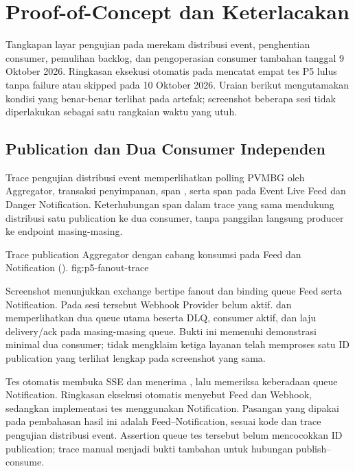 \section{Proof-of-Concept dan Keterlacakan}

Tangkapan layar pengujian pada  merekam distribusi event,
penghentian consumer, pemulihan backlog, dan pengoperasian consumer
tambahan tanggal 9 Oktober 2026. Ringkasan eksekusi otomatis pada
 mencatat empat tes
P5 lulus tanpa failure atau skipped pada 10 Oktober 2026. Uraian berikut
mengutamakan kondisi yang benar-benar terlihat pada artefak; screenshot
beberapa sesi tidak diperlakukan sebagai satu rangkaian waktu yang utuh.

\subsection{Publication dan Dua Consumer Independen}

Trace pengujian distribusi event memperlihatkan polling PVMBG oleh Aggregator, transaksi
penyimpanan, span , serta span
 pada Event Live Feed dan Danger Notification.
Keterhubungan span dalam trace yang sama mendukung distribusi satu
publication ke dua consumer, tanpa panggilan langsung producer ke
endpoint masing-masing.

{Trace publication Aggregator dengan cabang konsumsi pada Feed dan Notification ().}
{fig:p5-fanout-trace}

Screenshot  menunjukkan exchange
 bertipe fanout dan binding queue Feed serta
Notification. Pada sesi tersebut Webhook Provider belum aktif.
 dan  memperlihatkan dua queue utama
beserta DLQ, consumer aktif, dan laju delivery/ack pada masing-masing
queue. Bukti ini memenuhi demonstrasi minimal dua consumer; tidak
mengklaim ketiga layanan telah memproses satu ID publication yang
terlihat lengkap pada screenshot yang sama.

Tes otomatis membuka SSE dan menerima , lalu
memeriksa keberadaan queue Notification. Ringkasan eksekusi otomatis menyebut Feed dan
Webhook, sedangkan implementasi tes  menggunakan
Notification. Pasangan yang dipakai pada pembahasan hasil ini adalah
Feed--Notification, sesuai kode dan trace pengujian distribusi event. Assertion queue tes tersebut
belum mencocokkan ID publication; trace manual menjadi bukti tambahan
untuk hubungan publish--consume.

